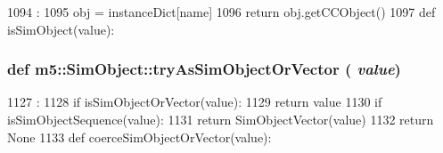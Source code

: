 \begin{DoxyCode}
1094                           :
1095     obj = instanceDict[name]
1096     return obj.getCCObject()
1097 
def isSimObject(value):
\end{DoxyCode}
\hypertarget{namespacem5_1_1SimObject_ad3817bd82ba420e25d855704f3c52138}{
\subsubsection[{tryAsSimObjectOrVector}]{\setlength{\rightskip}{0pt plus 5cm}def m5::SimObject::tryAsSimObjectOrVector ( {\em value})}}
\label{namespacem5_1_1SimObject_ad3817bd82ba420e25d855704f3c52138}



\begin{DoxyCode}
1127                                  :
1128     if isSimObjectOrVector(value):
1129         return value
1130     if isSimObjectSequence(value):
1131         return SimObjectVector(value)
1132     return None
1133 
def coerceSimObjectOrVector(value):
\end{DoxyCode}


